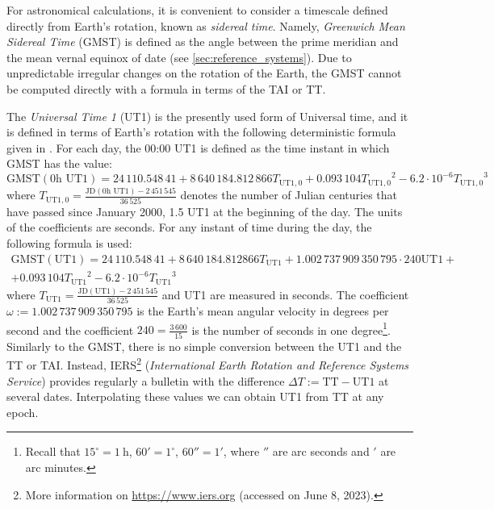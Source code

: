 \documentclass[../main.tex]{subfiles}
\begin{document}
For astronomical calculations, it is convenient to consider a timescale defined directly from Earth's rotation, known as \emph{sidereal time}. Namely, \emph{Greenwich Mean Sidereal Time} (GMST) is defined as the angle between the prime meridian and the mean vernal equinox of date (see \cref{sec:reference_systems}). Due to unpredictable irregular changes on the rotation of the Earth, the GMST cannot be computed directly with a formula in terms of the TAI or TT.

The \emph{Universal Time 1} (UT1) is the presently used form of Universal time, and it is defined in terms of Earth's rotation with the following deterministic formula given in \cite{aoki}. For each day, the 00:00 UT1 is defined as the time instant in which GMST has the value:
\begin{equation}
  \mathrm{GMST}(0\text{h UT1})=24\,110.548\,41+8\,640\,184.812\,866{T_{\text{UT1},0}}+0.093\,104{T_{\text{UT1},0}}^2-6.2\cdot 10^{-6}{T_{\text{UT1},0}}^3
\end{equation}
where $T_{\text{UT1},0}=\frac{\text{JD}(0\text{h UT1})-2\,451\,545}{36\,525}$ denotes the number of Julian centuries that have passed since January 2000, 1.5 UT1 at the beginning of the day. The units of the coefficients are seconds. For any instant of time during the day, the following formula is used:
\begin{multline}
  \mathrm{GMST}(\mathrm{UT1})=24\,110.548\,41+8\,640\,184.812866{T_{\text{UT1}}}+1.002\,737\,909\,350\,795\cdot240\text{UT1}+\\+0.093\,104{T_{\text{UT1}}}^2-{6.2\cdot 10^{-6}}{T_{\text{UT1}}}^3
\end{multline}
where $T_\text{UT1}=\frac{\text{JD}(\text{UT1})-2\,451\,545}{36\,525}$ and UT1 are measured in seconds. The coefficient $\omega:=1.002\,737\,909\,350\,795$ is the Earth's mean angular velocity in degrees per second and the coefficient $240=\frac{3\,600}{15}$ is the number of seconds in one degree\footnote{Recall that $15^\circ=1\ \text{h}$, $60'=1^\circ$, $60''=1'$, where $''$ are arc seconds and $'$ are arc minutes.}. Similarly to the GMST, there is no simple conversion between the UT1 and the TT or TAI. Instead, IERS\footnote{More information on \href{https://www.iers.org}{https://www.iers.org} (accessed on June 8, 2023).} (\emph{International Earth Rotation and Reference Systems Service}) provides regularly a bulletin with the difference $\Delta T:= \mathrm{TT}-\mathrm{UT1}$ at several dates. Interpolating these values we can obtain UT1 from TT at any epoch.
\end{document}
